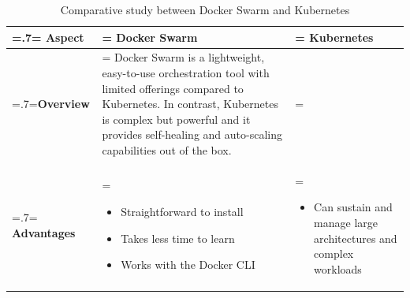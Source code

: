\begin{table}[H]
    \renewcommand{\arraystretch}{1.5}%
    \caption{Comparative study between Docker Swarm and Kubernetes}
    \centering
    \medskip
    \begin{tabularx}{1\textwidth} {
            | >{\hsize=.7\hsize\linewidth=\hsize\centering\arraybackslash}X
            | >{\hsize=1.15\hsize\linewidth=\hsize\justifying\arraybackslash}X
            | >{\hsize=1.15\hsize\linewidth=\hsize\justifying\arraybackslash}X |}
        \hline
        \rowcolor{primary} \textbf {Aspect} & \textbf{Docker Swarm}                                                                                                                                                                                                                                                              & \textbf{Kubernetes}                                                      \\
        \hline
        \textbf {Overview}                  & \multicolumn{2}{|>{\hsize=2.35\hsize}X|} {Docker Swarm is a lightweight, easy-to-use orchestration tool with limited offerings compared to Kubernetes. In contrast, Kubernetes is complex but powerful and it provides self-healing and auto-scaling capabilities out of the box.}                                                                            \\
        \hline
        \textbf {Advantages}                & \begin{itemize}[leftmargin=*, topsep=0pt, itemsep=1pt, parsep=2pt]
                                                  \item Straightforward to install
                                                  \item Takes less time to learn
                                                  \item Works with the Docker CLI
                                              \end{itemize}                                                                                                                                                                                                                 & \begin{itemize}[leftmargin=*, topsep=0pt, itemsep=1pt, parsep=2pt]
                                                                                                                                                                                                                                                                                  \item Can sustain and manage large architectures and complex workloads

\end{itemize}
\end{tabularx}
\end{table}
